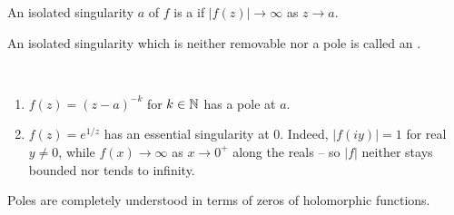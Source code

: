 \documentclass[a4paper]{scrartcl}
\begin{document}
\begin{definition}[Pole]
    An isolated singularity $a$ of $f$ is a  if $|f(z)| \rightarrow \infty$ as $z \rightarrow a$.
\end{definition}

\begin{definition}
    An isolated singularity which is neither removable nor a pole is called an .
\end{definition}

\begin{example}~
    \vspace*{-1.5\baselineskip}
    \begin{enumerate}[label=(\roman*)]
        \item $f(z) = (z - a)^{-k}$ for $k \in \mathbb{N}$ has a pole at $a$.
        \item $f(z) = e^{1/z}$ has an essential singularity at $0$. Indeed, $|f(iy)| = 1$ for real $y \neq 0$, while $f(x) \rightarrow \infty$ as $x \rightarrow 0^+$ along the reals -- so $|f|$ neither stays bounded nor tends to infinity.
    \end{enumerate}
\end{example}

Poles are completely understood in terms of zeros of holomorphic functions.
\end{document}

